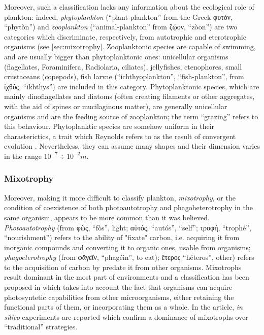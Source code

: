 Moreover, such a classification lacks any information about the ecological role of plankton: indeed, \textit{phytoplankton} (``plant-plankton'' from the Greek \textgreek{φυτόν}, ``phytòn'') and \textit{zooplankton} (``animal-plankton'' from \textgreek{ζῴον}, ``zòon'') are two categories which discriminate, respectively, from autotrophic and eterotrophic organisms (see \autoref{sec:mixotrophy}. Zooplanktonic species are capable of swimming, and are usually bigger than phytoplanktonic ones: unicellular organisms (flagellates, Foraminifera, Radiolaria, ciliates), jellyfishes, ctenophores, small crustaceans (copepods), fish larvae (``ichthyoplankton'', ``fish-plankton'', from \textgreek{ἰχθύς}, ``ikhthys'') are included in this category\autocite[chapter 4]{Lalli1997}. Phytoplanktonic species, which are mainly dinoflagellates and diatoms (often creating filaments or other aggregates, with the aid of spines or mucilaginous matter), are generally unicellular organisms and are the feeding source of zooplankton; the term ``grazing'' refers to this behaviour. Phytoplanktic species are somehow uniform in their charasterictics, a trait which Reynolds refers to as the result of convergent evolution \autocite[chapter 1.4]{reynolds2006ecology}. Nevertheless, they can assume many shapes and their dimension varies in the range $10^{-7}\div10^{-2}m$.

\subsubsection{Mixotrophy} \label{sec:mixotrophy}
Moreover, making it more difficult to classify plankton, \textit{mixotrophy}, or the condition of coexistence of both photoautotrophy and phagoheterotrophy in the same organism, appears to be more common than it was believed. \textit{Photoautotrophy} (from \textgreek{φῶς}, ``fòs'', light;  \textgreek{αὐτός}, ``autós'', “self”;  \textgreek{τροφή}, ``trophé'', “nourishment”) refers to the ability of "fixate" carbon, i.e. acquiring it from inorganic compounds and converting it to organic ones, usable from organisms; \textit{phagoeterotrophy} (from \textgreek{φᾰγεῖν}, ``phagéin'', to eat); \textgreek{ἕτερος} ``héteros'', other) refers to the acquisition of carbon by predate it from other organisms. Mixotrophs result dominant in the most part of environments \autocite{Stoecker2009AcquiredProtists} and a classification has been proposed in \autocite{Mitra2016DefiningStrategies} which takes into account the fact that organisms can acquire photosyntetic capabilities from other microorganisms, either retaining the functional parts of them, or incorporating them as a whole. In the article, \textit{in silico} experiments are reported which confirm a dominance of mixotrophs over ``traditional'' strategies. 

